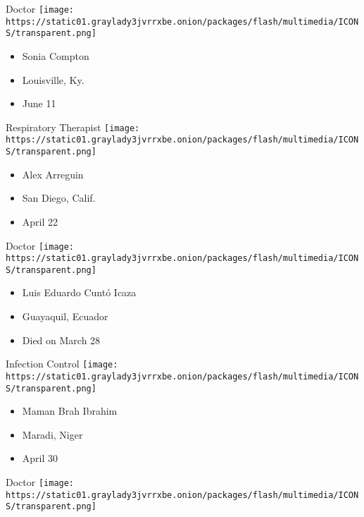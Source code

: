 \protect\hyperlink{item-sonia-compton}{}

Doctor
\texttt{[image: https://static01.graylady3jvrrxbe.onion/packages/flash/multimedia/ICONS/transparent.png]}

\begin{itemize}
\tightlist
\item
   Sonia Compton
\item
  Louisville, Ky.
\item
  June 11
\end{itemize}

\protect\hyperlink{item-alex-arreguin}{}

Respiratory Therapist
\texttt{[image: https://static01.graylady3jvrrxbe.onion/packages/flash/multimedia/ICONS/transparent.png]}

\begin{itemize}
\tightlist
\item
  Alex Arreguin
\item
  San Diego, Calif.
\item
  April 22
\end{itemize}

\protect\hyperlink{item-luis-eduardo-cunto-icaza}{}

Doctor
\texttt{[image: https://static01.graylady3jvrrxbe.onion/packages/flash/multimedia/ICONS/transparent.png]}

\begin{itemize}
\tightlist
\item
  Luis Eduardo Cuntó Icaza
\item
  Guayaquil, Ecuador
\item
  Died on March 28
\end{itemize}

\protect\hyperlink{item-maman-brah-ibrahim}{}

Infection Control
\texttt{[image: https://static01.graylady3jvrrxbe.onion/packages/flash/multimedia/ICONS/transparent.png]}

\begin{itemize}
\tightlist
\item
  Maman Brah Ibrahim
\item
  Maradi, Niger
\item
  April 30
\end{itemize}

\protect\hyperlink{item-maya-bunik}{}

Doctor
\texttt{[image: https://static01.graylady3jvrrxbe.onion/packages/flash/multimedia/ICONS/transparent.png]}


